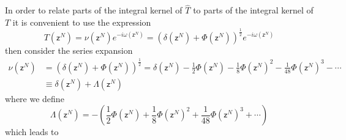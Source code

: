 \documentclass[aps,preprint]{revtex4}%
\begin{document}
In order to relate parts of the integral kernel of $\hat{T}$ to parts of the
integral kernel of $T$ it is convenient to use the expression
\begin{equation}
T\left(  \mathsf{z}^{N}\right)  =\nu\left(  \mathsf{z}^{N}\right)
e^{-i\omega\left(  \mathsf{z}^{N}\right)  }=\left(  \delta\left(
\mathsf{z}^{N}\right)  +\Phi\left(  \mathsf{z}^{N}\right)  \right)  ^{\frac
{1}{2}}e^{-i\omega\left(  \mathsf{z}^{N}\right)  } \label{T}%
\end{equation}
then consider the series expansion
\begin{align}
\nu\left(  \mathsf{z}^{N}\right)   &  =\left(  \delta\left(  \mathsf{z}%
^{N}\right)  +\Phi\left(  \mathsf{z}^{N}\right)  \right)  ^{\frac{1}{2}%
}=\delta\left(  \mathsf{z}^{N}\right)  -\frac{1}{2}\Phi\left(  \mathsf{z}%
^{N}\right)  -\frac{1}{8}\Phi\left(  \mathsf{z}^{N}\right)  ^{2}-\frac{1}%
{48}\Phi\left(  \mathsf{z}^{N}\right)  ^{3}-\cdots\nonumber\\
&  \equiv\delta\left(  \mathsf{z}^{N}\right)  +\Lambda\left(  \mathsf{z}%
^{N}\right)
\end{align}
where we define
\begin{equation}
\Lambda\left(  \mathsf{z}^{N}\right)  =-\left(  \frac{1}{2}\Phi\left(
\mathsf{z}^{N}\right)  +\frac{1}{8}\Phi\left(  \mathsf{z}^{N}\right)
^{2}+\frac{1}{48}\Phi\left(  \mathsf{z}^{N}\right)  ^{3}+\cdots\right)
\label{rootex}%
\end{equation}
which leads to
\end{document}
